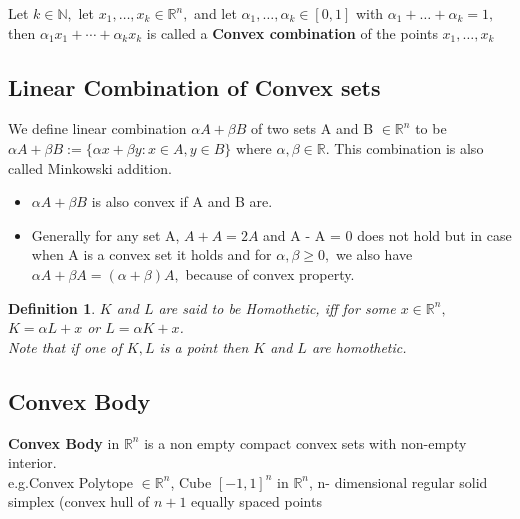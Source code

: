 \documentclass[oneside]{book}
\newtheorem{mydef}{Definition}
\begin{document}
Let $k \in \mathbb{N},$ let $x_{1}, \ldots, x_{k} \in \mathbb{R}^{n},$ and let $\alpha_{1}, \ldots, \alpha_{k} \in[0,1]$ with $\alpha_{1}+\ldots+\alpha_{k}=1,$ then
$\alpha_{1} x_{1}+\cdots+\alpha_{k} x_{k}$ is called a \textbf{Convex combination} of the points $x_{1}, \ldots, x_{k}$









\subsection{Linear Combination of Convex sets}
\label{ss:5}
We define linear combination $\alpha A+\beta B$ of two sets A and B $\in \mathbb{R}^n$ to be 
$\alpha A+\beta B:=\{\alpha x+\beta y: x \in A, y \in B\}$ where $\alpha,\beta \in \mathbb{R}$.
This combination is also called Minkowski addition.


\begin{itemize}
    \item $\alpha A+\beta B $ is also convex if A and B are. 
\item
Generally for any set A, $A +A = 2A $ and A - A = 0  does not hold but in case when A is a convex set it holds and 
 for $\alpha, \beta \geq 0,$ we also have $\alpha A+\beta A=(\alpha+\beta) A,$ because of convex property. \end{itemize}
 
 \begin{mydef} \label{d:1}
$K$ and $L$ are said to be Homothetic, iff for some $x  \in \mathbb{R}^n,$ $K = \alpha L + x$ or $L=\alpha K+x $.\\
Note that if one of $K,L $ is a point then $K $ and $L$ are homothetic.
\end{mydef}





 \subsection{Convex Body}
 \label{ss:6}
\textbf{Convex Body } in  $\mathbb{R}^n$  is a non empty compact convex sets with non-empty interior.\\
e.g.Convex Polytope $\in \mathbb{R}^n$, Cube $[-1,1]^{n}$  in $ \mathbb{R}^n$, n- dimensional regular solid simplex (convex hull of $n+1$ equally spaced points 
\end{document}

